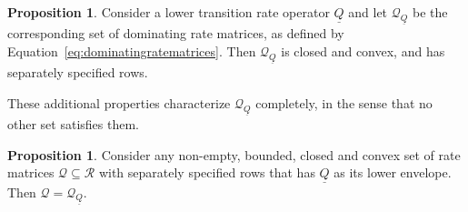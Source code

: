 \documentclass[10pt,a4paper]{paper}
\theoremstyle{definition}
\newtheorem{proposition}[theorem]{Proposition}
\newcommand{\rateset}{\mathcal{Q}}
\newcommand{\lrate}{\underline{Q}}
\begin{document}
\begin{proposition}\label{prop:dominatingproperties}
Consider a lower transition rate operator $\lrate$ and let $\rateset_{\lrate}$ be the corresponding set of dominating rate matrices, as defined by Equation~\eqref{eq:dominatingratematrices}. Then $\rateset_{\lrate}$ is closed and convex, and has separately specified rows.
\end{proposition}

\noindent
These additional properties characterize $\rateset_{\lrate}$ completely, in the sense that no other set satisfies them.

\begin{proposition}\label{prop:dominating_unique_characterization}
Consider any non-empty, bounded, closed and convex set of rate matrices $\rateset\subseteq\mathcal{R}$ with separately specified rows that has $\lrate$ as its lower envelope. Then $\rateset=\rateset_{\lrate}$.
\end{proposition}
\end{document}
